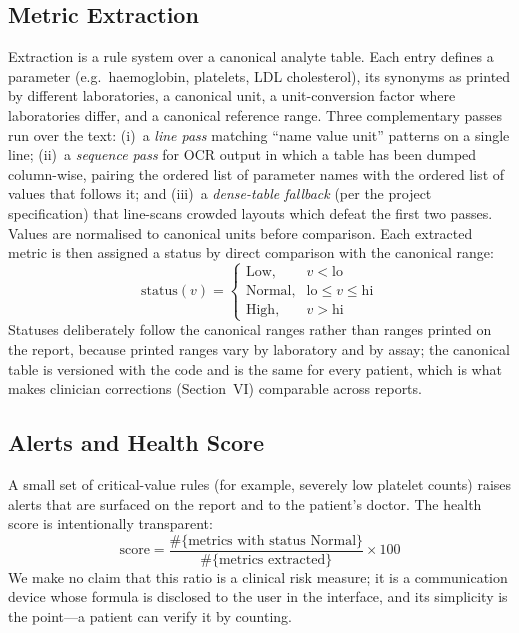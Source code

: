 \documentclass[conference]{IEEEtran}
\begin{document}
\subsection{Metric Extraction}
Extraction is a rule system over a canonical analyte table. Each entry
defines a parameter (e.g.\ haemoglobin, platelets, LDL cholesterol),
its synonyms as printed by different laboratories, a canonical unit, a
unit-conversion factor where laboratories differ, and a canonical
reference range. Three complementary passes run over the text:
(i)~a \emph{line pass} matching ``name value unit'' patterns on a single
line; (ii)~a \emph{sequence pass} for OCR output in which a table has
been dumped column-wise, pairing the ordered list of parameter names
with the ordered list of values that follows it; and (iii)~a
\emph{dense-table fallback} (per the project specification) that
line-scans crowded layouts which defeat the first two passes. Values
are normalised to canonical units before comparison. Each extracted
metric is then assigned a status by direct comparison with the
canonical range:
\begin{equation}
\text{status}(v) =
\begin{cases}
\text{Low}, & v < \text{lo} \\
\text{Normal}, & \text{lo} \le v \le \text{hi} \\
\text{High}, & v > \text{hi}
\end{cases}
\end{equation}
Statuses deliberately follow the canonical ranges rather than ranges
printed on the report, because printed ranges vary by laboratory and by
assay; the canonical table is versioned with the code and is the same
for every patient, which is what makes clinician corrections
(Section~VI) comparable across reports.

\subsection{Alerts and Health Score}
A small set of critical-value rules (for example, severely low platelet
counts) raises alerts that are surfaced on the report and to the
patient's doctor. The health score is intentionally transparent:
\begin{equation}
\text{score} = \frac{\#\{\text{metrics with status Normal}\}}
{\#\{\text{metrics extracted}\}} \times 100
\end{equation}
We make no claim that this ratio is a clinical risk measure; it is a
communication device whose formula is disclosed to the user in the
interface, and its simplicity is the point---a patient can verify it by
counting.
\end{document}
